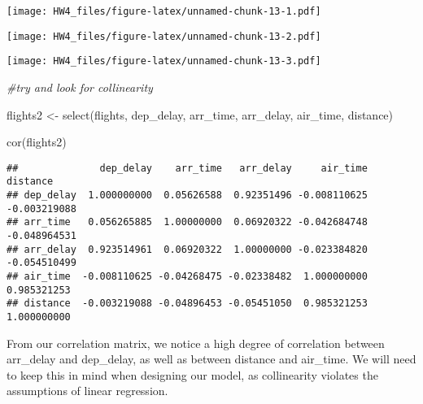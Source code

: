 \documentclass[
]{article}
\newenvironment{Shaded}{\begin{snugshade}}{\end{snugshade}}
\newcommand{\AttributeTok}[1]{\textcolor[rgb]{0.77,0.63,0.00}{#1}}
\newcommand{\CommentTok}[1]{\textcolor[rgb]{0.56,0.35,0.01}{\textit{#1}}}
\newcommand{\FunctionTok}[1]{\textcolor[rgb]{0.00,0.00,0.00}{#1}}
\newcommand{\NormalTok}[1]{#1}
\newcommand{\OtherTok}[1]{\textcolor[rgb]{0.56,0.35,0.01}{#1}}
\newcommand{\SpecialCharTok}[1]{\textcolor[rgb]{0.00,0.00,0.00}{#1}}
\newcommand{\StringTok}[1]{\textcolor[rgb]{0.31,0.60,0.02}{#1}}
\begin{document}
\texttt{[image: HW4\_files/figure-latex/unnamed-chunk-13-1.pdf]}

\begin{Shaded}
\end{Shaded}

\texttt{[image: HW4\_files/figure-latex/unnamed-chunk-13-2.pdf]}

\begin{Shaded}
\end{Shaded}

\texttt{[image: HW4\_files/figure-latex/unnamed-chunk-13-3.pdf]}

\begin{Shaded}
\begin{Highlighting}[]
\CommentTok{\#try and look for collinearity}

\NormalTok{flights2 }\OtherTok{\textless{}{-}} \FunctionTok{select}\NormalTok{(flights, dep\_delay, arr\_time, arr\_delay, air\_time, distance)}

\FunctionTok{cor}\NormalTok{(flights2) }
\end{Highlighting}
\end{Shaded}

\begin{verbatim}
##              dep_delay    arr_time   arr_delay     air_time     distance
## dep_delay  1.000000000  0.05626588  0.92351496 -0.008110625 -0.003219088
## arr_time   0.056265885  1.00000000  0.06920322 -0.042684748 -0.048964531
## arr_delay  0.923514961  0.06920322  1.00000000 -0.023384820 -0.054510499
## air_time  -0.008110625 -0.04268475 -0.02338482  1.000000000  0.985321253
## distance  -0.003219088 -0.04896453 -0.05451050  0.985321253  1.000000000
\end{verbatim}

From our correlation matrix, we notice a high degree of correlation
between arr\_delay and dep\_delay, as well as between distance and
air\_time. We will need to keep this in mind when designing our model,
as collinearity violates the assumptions of linear regression.
\end{document}

